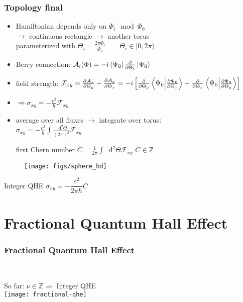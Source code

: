 \begin{frame}
\frametitle{Topology final}
\begin{itemize}
	\item Hamiltonian depends only on $\Phi_i \mod \Phi_0$\\
	$\rightarrow$ continuous rectangle $\rightarrow$ another torus\\parameterized with \quad $\Theta_i = \frac{2\pi\Phi_i}{\Phi_0} \qquad \Theta_i \in [0,2\pi)$
	\item Berry connection: \quad $\mathcal{A}_i(\Phi) = -i\bra{\Psi_0}\frac{\partial}{\partial \Theta_i} \ket{\Psi_0}$
	\item field strength: \quad $\mathcal{F}_{xy} = \frac{\partial \mathcal{A}_x}{\partial \Theta_y} - \frac{\partial \mathcal{A}_y}{\partial \Theta_x} =
	 -i\left[\frac{\partial}{\partial \Theta_y} \braket{\Psi_0}{\frac{\partial \Psi_0}{\partial \Theta_x}} - \frac{\partial}{\partial \Theta_x} \braket{\Psi_0}{\frac{\partial \Psi_0}{\partial \Theta_y}}\right]$
	 \item $\Rightarrow\sigma_{xy} = -\frac{e^2}{\hbar} \mathcal{F}_{xy}$
	 \item average over all fluxes $\rightarrow$ integrate over torus:\\
	 $\sigma_{xy} = -\frac{e^2}{\hbar} \int \frac{\mathop{}\!\mathrm{d}^2 \Theta}{(2\pi)^2} \mathcal{F}_{xy}$\\ \pause
	 \begin{block}{first Chern number}
		\centering$C = \frac{1}{2\pi} \int \mathop{}\!\mathrm{d}^2 \Theta \mathcal{F}_{xy}$ \qquad $C \in \mathbb{Z}$
	 \end{block}
\end{itemize}
\end{frame}

\begin{frame}
	\begin{figure}
		\centering
		\texttt{[image: figs/sphere\_hd]}
		\label{fig:sphere_hd}
	\end{figure}
	\begin{block}{Integer QHE}
		\centering$\sigma_{xy} = -\dfrac{e^2}{2\pi\hbar} C$
	\end{block}
\end{frame}


\section{Fractional Quantum Hall Effect}
\begin{frame}
\frametitle{Fractional Quantum Hall Effect}
\begin{columns}
	\column[]{12cm}
	\ \\So far: $\nu \in \mathbb{Z} \Rightarrow$ Integer QHE\\
	\centering
	\texttt{[image: fractional-qhe]}
	
\end{columns}



\end{frame}

